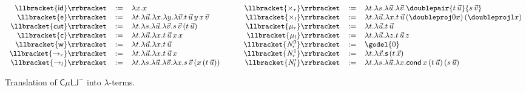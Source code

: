 \documentclass[10pt,a4paper]{amsart}
\theoremstyle{plain}
\theoremstyle{definition}
\newcommand{\dfn}{:=}
\theoremstyle{plain}
\theoremstyle{definition} %
\renewcommand{\succ}{\mathsf s}
\newcommand{\sem}[1]{\llbracket {#1} \rrbracket}
\newcommand{\nat}{\mathit{N}}
\newcommand{\N}{\nat} %
\newcommand{\unit}{1}
\newcommand{\arrow}{\to}
\newcommand{\cnd}{\mathsf{cond}}
\newcommand{\Nzero}{\rr\N^0}
\newcommand{\Nsucc}{\rr\N^1}
\newcommand{\Ncnd}{\lr \N'}
\newcommand{\id}{\mathsf{id}}
\newcommand{\ax}{\id}
\newcommand{\ex}{\mathsf{e}}
\newcommand{\cut}{\mathsf{cut}}
\newcommand{\wk}{\mathsf{w}}
\newcommand{\contr}{\mathsf{c}}
\newcommand{\lr}[1]{#1_l}
\newcommand{\rr}[1]{#1_r}
\newcommand{\cev}[1]{#1^0} %
\newcommand{\LJ}{\mathsf{LJ}}
\newcommand{\muLJ}{\mu\LJ}
\newcommand{\circular}{\mathsf C}
\newcommand{\cmuLJ}{\circular\muLJ}
\newcommand{\cmuLJneg}{\cmuLJ^-}
\newcommand{\identity}{\mathsf{I}}
\newcommand{\enc}[1]{\underline{#1}}
\newcommand{\true}{\mathsf{tt}}
\newcommand{\false}{\mathsf{ff}}
\newcommand{\inject}[2]{\mathsf{inj}_{#1}(#2)}
\newcommand{\letid}[2]{\mathsf{let}\ {#1}\ \mathsf{ be \ }\identity \mathsf{\ in \ }{#2}}
\newcommand{\ifthen}[3]{\mathsf{if \ }{#1}\mathsf{\ then\ }{#2}\mathsf{\ else\ }{#3}}
\begin{document}
\begin{figure}[t]
    \centering
   \[
   \small
   \begin{array}{rcl}
       \sem{\ax}& \dfn& \lambda x.x \\
        \sem{\ex}&\dfn &\lambda t. \lambda \vec u. \lambda x. \lambda y. \lambda \vec v. t\, \vec u \,y\,x\, \vec v \\
  \sem{\cut}&\dfn &\lambda t. \lambda s. \lambda \vec{u}.\lambda \vec v. s\, \vec v \, (t \,\vec u)  \\ 
  \sem{\contr}&\dfn &\lambda t. \lambda \vec u. \lambda x. t\,\vec u \,x\,x\\ 
  \sem{\wk}&\dfn &\lambda t. \lambda \vec u. \lambda x. t \,\vec u  \\
   \sem{\rr \arrow}&\dfn& \lambda t. \lambda \vec u. \lambda x. t \,\vec u\, x\\  
   \sem{\lr \arrow}&\dfn& \lambda t. \lambda s. \lambda \vec u. \lambda \vec v. \lambda x.  s\,\vec v\,(x\,(t\,\vec u))\\
   \end{array}
   \qquad
   \begin{array}{rcl}
         \sem{\rr \times }& \dfn&  \lambda t. \lambda s. \lambda \vec{u}.\lambda \vec v . \doublepair {t\, \vec u}{s \, \vec v} \\
  \sem{\lr \times}&\dfn &\lambda t. \lambda \vec u. \lambda x. {t\,  \vec u \, (\doubleproj0 x) \, (\doubleproj1 x)}  
\\
\sem{\rr \mu}&\dfn &\lambda t. \lambda \vec{u}. t\, \vec u \\
  \sem{\lr \mu}&\dfn& \lambda t. \lambda \vec{u}. \lambda z. t \, \vec u \, z  \\ 
  \sem{\Nzero}&\dfn & \godel{0}\\
  \sem{\Nsucc}&\dfn& \lambda t.\lambda \vec x. \succ \, {(t\, \vec x)}\\
  \sem{\Ncnd} &\dfn & \lambda t. \lambda s. \lambda \vec u. \lambda x. \cnd\, {x}\, {(t \, \vec u)}\, {(s\, \vec u)}
   \end{array}
   \]
    \caption{Translation of  $\cmuLJneg$ into $\lambda$-terms.}
    \label{fig:translation-of-rules}
\end{figure}
\end{document}

